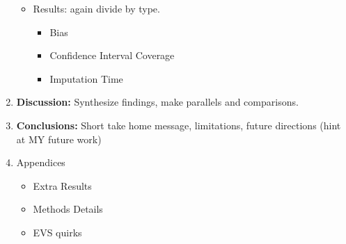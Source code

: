 \begin{enumerate}
\begin{itemize}
	\item Results: again divide by type.		
	\begin{itemize}
 	   \item Bias
	   \item Confidence Interval Coverage
	   \item Imputation Time
	\end{itemize}

  \end{itemize}

 \item \textbf{Discussion:}
	Synthesize findings, make parallels and comparisons.

\item \textbf{Conclusions:}
	Short take home message, limitations, future directions (hint at MY future work)

\item Appendices
	\begin{itemize}
 	   \item Extra Results
	   \item Methods Details
	   \item EVS quirks
	\end{itemize}

\end{enumerate}



